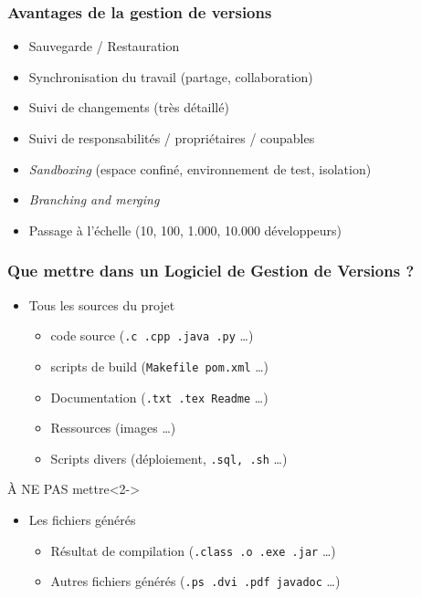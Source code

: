 \documentclass[table,tikz,12pt,svgnames]{beamer}
\begin{document}
\begin{frame}
	\frametitle{Avantages de la gestion de versions}
	\begin{block}{}
    \begin{adjustwidth}{-0.3cm}{-1.4cm}{}
		\begin{itemize}
			\item Sauvegarde / Restauration
			\item Synchronisation du travail (partage, collaboration)
			\item Suivi de changements (très détaillé)
			\item Suivi de responsabilités / propriétaires / coupables
			\item \textit{Sandboxing} (espace confiné, environnement de test, isolation)
			\item \textit{Branching and merging}
			\item Passage à l'échelle (10, 100, 1.000, 10.000 développeurs)
		\end{itemize}
	\end{adjustwidth}
	\end{block}
\end{frame}

\begin{frame}
	\frametitle{Que mettre dans un Logiciel de Gestion de Versions ?}
	\vspace{-2em}
	\begin{block}{}%
    \begin{adjustwidth}{-0.5cm}{}
		\begin{itemize}
			\item Tous les sources du projet
			\begin{itemize}
				\item code source (\texttt{.c .cpp .java .py} \dots)
				\item scripts de build (\texttt{Makefile pom.xml} \ldots)
				\item Documentation (\texttt{.txt .tex Readme} \ldots)
				\item Ressources (images \ldots)
				\item Scripts divers (déploiement, \texttt{.sql, .sh} \ldots)
			\end{itemize}
		\end{itemize}
	\end{adjustwidth}	
	\end{block}
	\begin{block}{\color{red} À NE PAS mettre}<2->
    \begin{adjustwidth}{-0.5cm}{}
	\begin{itemize}
		\item Les fichiers générés
		\begin{itemize}
			\item Résultat de compilation (\texttt{.class .o .exe .jar} \ldots)
			\item Autres fichiers générés (\texttt{.ps .dvi .pdf javadoc} \ldots)
		\end{itemize}
	\end{itemize}
	\end{adjustwidth}
	\end{block}
\end{frame}
\end{document}

